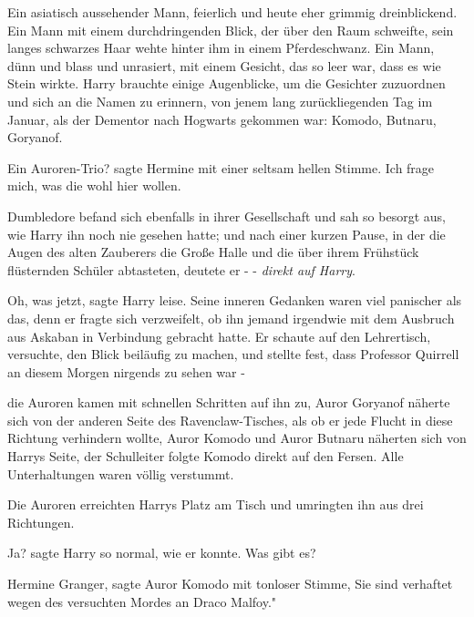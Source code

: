 Ein asiatisch aussehender Mann, feierlich und heute eher grimmig dreinblickend.
Ein Mann mit einem durchdringenden Blick, der über den Raum schweifte, sein
langes schwarzes Haar wehte hinter ihm in einem Pferdeschwanz. Ein Mann, dünn
und blass und unrasiert, mit einem Gesicht, das so leer war, dass es wie Stein
wirkte. Harry brauchte einige Augenblicke, um die Gesichter zuzuordnen und sich
an die Namen zu erinnern, von jenem lang zurückliegenden Tag im Januar, als der
Dementor nach Hogwarts gekommen war: Komodo, Butnaru, Goryanof.

\glqq Ein Auroren-Trio?\grqq{} sagte Hermine mit einer seltsam hellen Stimme.
\glqq Ich frage mich, was die wohl hier wollen.\grqq{}

Dumbledore befand sich ebenfalls in ihrer Gesellschaft und sah so besorgt aus,
wie Harry ihn noch nie gesehen hatte; und nach einer kurzen Pause, in der die
Augen des alten Zauberers die Große Halle und die über ihrem Frühstück
flüsternden Schüler abtasteten, deutete er - -\emph{ direkt auf Harry}.

\glqq Oh, was jetzt\grqq{}, sagte Harry leise. Seine inneren Gedanken waren viel
panischer als das, denn er fragte sich verzweifelt, ob ihn jemand irgendwie mit
dem Ausbruch aus Askaban in Verbindung gebracht hatte. Er schaute auf den
Lehrertisch, versuchte, den Blick beiläufig zu machen, und stellte fest, dass
Professor Quirrell an diesem Morgen nirgends zu sehen war -

die Auroren kamen mit schnellen Schritten auf ihn zu, Auror Goryanof näherte
sich von der anderen Seite des Ravenclaw-Tisches, als ob er jede Flucht in diese
Richtung verhindern wollte, Auror Komodo und Auror Butnaru näherten sich von
Harrys Seite, der Schulleiter folgte Komodo direkt auf den Fersen. Alle
Unterhaltungen waren völlig verstummt.

Die Auroren erreichten Harrys Platz am Tisch und umringten ihn aus drei
Richtungen.

\glqq Ja?\grqq{} sagte Harry so normal, wie er konnte. \glqq Was gibt es?\grqq{}

\glqq Hermine Granger\grqq{}, sagte Auror Komodo mit tonloser Stimme, \glqq Sie
sind verhaftet wegen des versuchten Mordes an Draco Malfoy."

